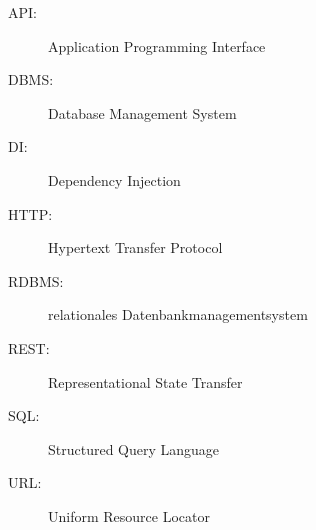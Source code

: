 \label{sec:abkuerzungsverzeichnis}

\begin{description}
  	\item[API:] Application Programming Interface
	\item[DBMS:] Database Management System
	\item[DI:] Dependency Injection
	\item[HTTP:] Hypertext Transfer Protocol
	\item[RDBMS:] relationales Datenbankmanagementsystem
	\item[REST:] Representational State Transfer
	\item[SQL:]Structured Query Language
	\item[URL:] Uniform Resource Locator
\end{description}

